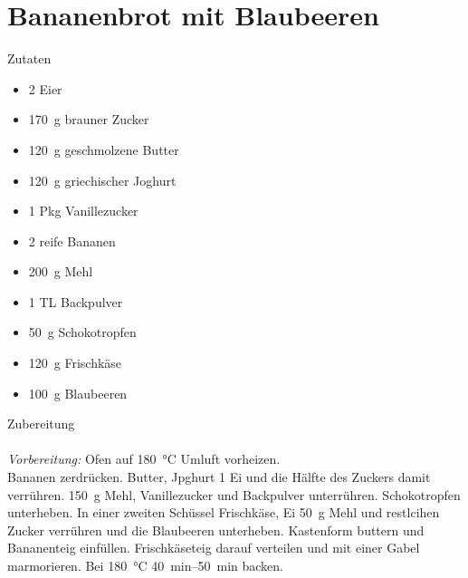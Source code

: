 \section*{Bananenbrot mit Blaubeeren}
\ihead{}\ohead{}
\cfoot{}
{\Large Zutaten}
\begin{multicols}{2}
\begin{itemize}
    \item \num{2} Eier
    \item \SI{170}{g} brauner Zucker
    \item \SI{120}{g} geschmolzene Butter
    \item \SI{120}{g} griechischer Joghurt
    \item \num{1} Pkg Vanillezucker
    \item \num{2} reife Bananen
    \item \SI{200}{g} Mehl
    \item \num{1} TL Backpulver
    \item \SI{50}{g} Schokotropfen
    \item \SI{120}{g} Frischkäse
    \item \SI{100}{g} Blaubeeren
\end{itemize}
\end{multicols}
\noindent
{\Large Zubereitung}\\
\\
\textit{Vorbereitung:} Ofen auf \SI{180}{\celsius} Umluft vorheizen.\\
Bananen zerdrücken.
Butter, Jpghurt \num{1} Ei und die Hälfte des Zuckers damit verrühren.
\SI{150}{g} Mehl, Vanillezucker und Backpulver unterrühren.
Schokotropfen unterheben.
In einer zweiten Schüssel Frischkäse, Ei \SI{50}{g} Mehl und restlcihen Zucker verrühren und die Blaubeeren unterheben.
Kastenform buttern und Bananenteig einfüllen. 
Frischkäseteig darauf verteilen und mit einer Gabel marmorieren.
Bei \SI{180}{\celsius} \SIrange{40}{50}{min} backen.